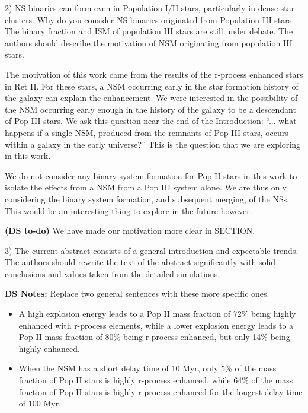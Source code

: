 \documentclass[11pt]{article}
\begin{document}
\begin{tcolorbox}[colback={lightgray}]
    2)      NS binaries can form even in Population I/II stars, particularly in dense star clusters. Why do you consider NS binaries originated from Population III stars. The binary fraction and ISM of population III stars are still under debate. The authors should describe the motivation of NSM originating from population III stars.
\end{tcolorbox}

The motivation of this work came from the results of the r-process enhanced stars in Ret II. For these stars, a NSM occurring early in the star formation history of the galaxy can explain the enhancement. We were interested in the possibility of the NSM occurring early enough in the history of the galaxy to be a descendant of Pop III stars. We ask this question near the end of the Introduction: ``... what happens if a single NSM, produced from the remnants of Pop III stars, occurs within a galaxy in the early universe?'' This is the question that we are exploring in this work.

We do not consider any binary system formation for Pop II stars in this work to isolate the effects from a NSM from a Pop III system alone. We are thus only considering the binary system formation, and subsequent merging, of the NSs. This would be an interesting thing to explore in the future however.

\textbf{(DS to-do)} We have made our motivation more clear in SECTION.

\begin{tcolorbox}[colback={lightgray}]
    3)      The current abstract consists of a general introduction and expectable trends. The authors should rewrite the text of the abstract significantly with solid conclusions and values taken from the detailed simulations.
\end{tcolorbox}

\textbf{DS Notes:}
Replace two general sentences with these more specific ones.
\begin{itemize}
    \item A high explosion energy leads to a Pop II mass fraction of 72\% being highly enhanced with r-process elements, while a lower explosion energy leads to a Pop II mass fraction of 80\% being r-process enhanced, but only 14\% being highly enhanced.
    \item When the NSM has a short delay time of 10 Myr, only 5\% of the mass fraction of Pop II stars is highly r-process enhanced, while 64\% of the mass fraction of Pop II stars is highly r-process enhanced for the longest delay time of 100 Myr. 
\end{itemize}
\end{document}
